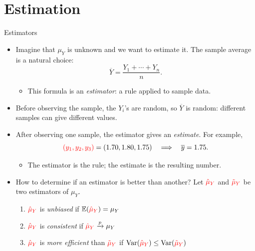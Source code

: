 \documentclass[notes,10pt, aspectratio=169]{beamer}
\begin{document}
\section{Estimation}
\begin{frame}{Estimators}
\begin{itemize}
    \item Imagine that $\mu_Y$ is unknown and we want to estimate it. The sample average is a natural choice:
    \[
        \overline{Y}=\frac{Y_1+\cdots+Y_n}{n}.
    \]
    \begin{itemize}
        \item This formula is an \textit{estimator}: a rule applied to sample data.
    \end{itemize}
    \item Before observing the sample, the $Y_i$'s are random, so $\overline{Y}$ is random: different samples can give different values.
    \item After observing one sample, the estimator gives an \textit{estimate}. For example,
    \[
        \textcolor{red}{(y_1,y_2,y_3)}=(1.70,1.80,1.75)\quad\Longrightarrow\quad \overline{y}=1.75.
    \]
    \begin{itemize}
        \item The estimator is the rule; the estimate is the resulting number.
    \end{itemize}
    \item How to determine if an estimator is better than another? Let $\textcolor{red}{\hat{\mu}_Y}$ and $\textcolor{red}{\tilde{\mu}_Y}$ be two estimators of $\mu_Y$.
    \begin{enumerate}
        \item $\textcolor{red}{\hat{\mu}_Y}$ is \textit{unbiased} if $\mathbb{E}(\textcolor{red}{\hat{\mu}_Y}) = \mu_Y$
        \item $\textcolor{red}{\hat{\mu}_Y}$ is \textit{consistent} if $\textcolor{red}{\hat{\mu}_Y} \xrightarrow{\mathit{p}}\mu_Y$
        \item $\textcolor{red}{\hat{\mu}_Y}$ is \textit{more efficient}  than $\textcolor{red}{\tilde{\mu}_Y}$ if $\operatorname{Var}(\textcolor{red}{\hat{\mu}_Y}) \leq \operatorname{Var}(\textcolor{red}{\tilde{\mu}_Y})$
    \end{enumerate}
\end{itemize}
\end{frame}
\end{document}
